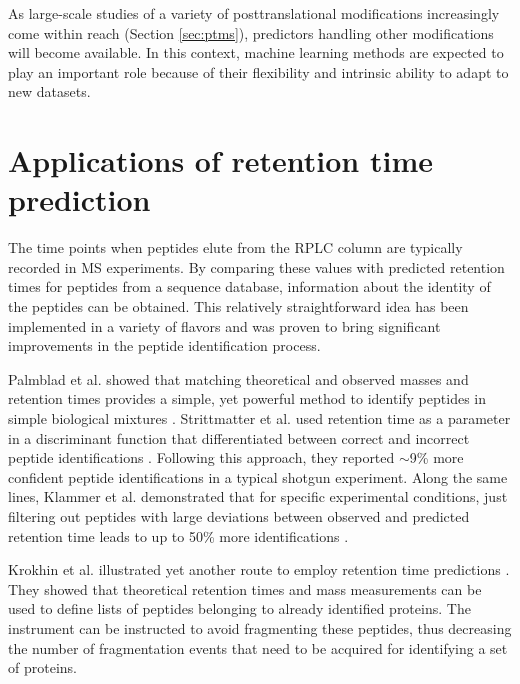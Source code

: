 \documentclass[a4paper]{article}
\begin{document}
\vspace{0.15cm}

As large-scale studies of a variety of posttranslational modifications
increasingly come within reach (Section \ref{sec:ptms}), predictors
handling other modifications will become available. In this context,
machine learning methods are expected to play an important role
because of their flexibility and intrinsic ability to adapt to new
datasets.


\section{\label{sec:app}Applications of retention time prediction}

The time points when peptides elute from the RPLC column are typically
recorded in MS experiments. By comparing these values with predicted
retention times for peptides from a sequence database, information
about the identity of the peptides can be obtained. This relatively
straightforward idea has been implemented in a variety of flavors and
was proven to bring significant improvements in the peptide
identification process.

\vspace{0.15cm}

Palmblad et al. showed that matching theoretical and observed masses
and retention times provides a simple, yet powerful method to identify
peptides in simple biological
mixtures \cite{palmblad2002prediction}. Strittmatter et al. used
retention time as a parameter in a discriminant function that
differentiated between correct and incorrect peptide
identifications \cite{Strittmatter2004}. Following this approach, they
reported $\sim$9\% more confident peptide identifications in a typical
shotgun experiment. Along the same lines, Klammer et al. demonstrated
that for specific experimental conditions, just filtering out peptides
with large deviations between observed and predicted retention time
leads to up to 50\% more
identifications \cite{klammer2007improving}. 

\vspace{0.15cm}

Krokhin et al. illustrated yet another route to employ retention time
predictions \cite{krokhin200612, McQueen2012}. They showed that
theoretical retention times and mass measurements can be used to
define lists of peptides belonging to already identified proteins. The
instrument can be instructed to avoid fragmenting these peptides, thus
decreasing the number of fragmentation events that need to be acquired
for identifying a set of proteins.
\end{document}
